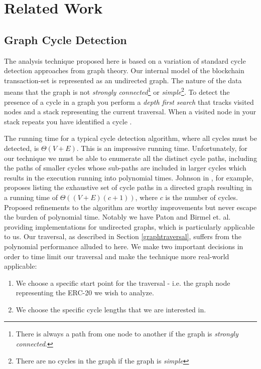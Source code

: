 \documentclass[conference]{IEEEtran}
\begin{document}
\section{Related Work} \label{relatedwork}

\subsection{Graph Cycle Detection} \label{graphcycles}
The analysis technique proposed here is based on a variation of standard cycle detection approaches from graph theory. Our internal model of the blockchain transaction-set is represented as an undirected graph. The nature of the data means that the graph is not \emph{strongly connected}\footnote{There is always a path from one node to another if the graph is \emph{strongly connected}.} or \emph{simple}\footnote{There are no cycles in the graph if the graph is \emph{simple}}. To detect the presence of a cycle in a graph you perform a \emph{depth first search} that tracks visited nodes and a stack representing the current traversal.  When a visited node in your stack repeats you have identified a cycle \cite{cormen2009introduction}.

The running time for a typical cycle detection algorithm\cite{cormen2009introduction}, where all cycles must be detected, is $\Theta(V+E)$.  This is an impressive running time.  Unfortunately, for our technique we must be able to enumerate all the distinct cycle paths, including the paths of smaller cycles whose sub-paths are included in larger cycles which results in the execution running into polynomial times. Johnson in \cite{johnson1975finding}, for example, proposes listing the exhaustive set of cycle paths in a directed graph resulting in a running time of $\Theta((V + E)(c + 1))$, where $c$ is the number of cycles. Proposed refinements to the algorithm are worthy improvements but never escape the burden of polynomial time.  Notably we have Paton \cite{paton1969algorithm} and Birmel et. al. \cite{birmele2013optimal} providing implementations for undirected graphs, which is particularly applicable to us.   Our traversal, as described in Section \ref{graphtraversal}, suffers from the polynomial performance alluded to here.  We make two important decisions in order to time limit our traversal and make the technique more real-world applicable:

\begin{enumerate}
    \item We choose a specific start point for the traversal - i.e. the graph node representing the ERC-20 we wish to analyze.  
    \item We choose the specific cycle lengths that we are interested in. 
\end{enumerate}
\end{document}
